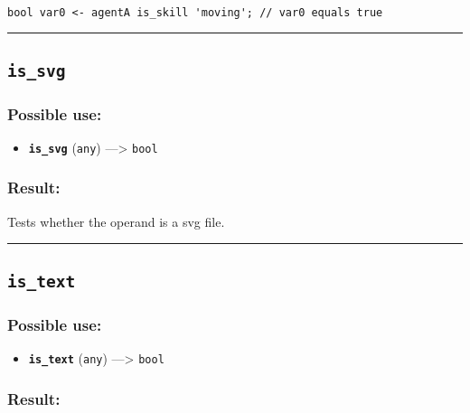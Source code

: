 \documentclass[]{book}
\providecommand{\tightlist}{%
  \setlength{\itemsep}{0pt}\setlength{\parskip}{0pt}}
\theoremstyle{definition}
\theoremstyle{definition}
\theoremstyle{definition}
\theoremstyle{remark}
\begin{document}
\begin{verbatim}
 
bool var0 <- agentA is_skill 'moving'; // var0 equals true
\end{verbatim}

\begin{center}\rule{0.5\linewidth}{\linethickness}\end{center}

\subsection{\texorpdfstring{\texttt{is\_svg}}{is\_svg}}\label{is_svg}

\subsubsection{Possible use:}\label{possible-use-304}

\begin{itemize}
\tightlist
\item
  \textbf{\texttt{is\_svg}} (\texttt{any}) ---\textgreater{}
  \texttt{bool}
\end{itemize}

\subsubsection{Result:}\label{result-294}

Tests whether the operand is a svg file.

\begin{center}\rule{0.5\linewidth}{\linethickness}\end{center}

\subsection{\texorpdfstring{\texttt{is\_text}}{is\_text}}\label{is_text}

\subsubsection{Possible use:}\label{possible-use-305}

\begin{itemize}
\tightlist
\item
  \textbf{\texttt{is\_text}} (\texttt{any}) ---\textgreater{}
  \texttt{bool}
\end{itemize}

\subsubsection{Result:}\label{result-295}
\end{document}
